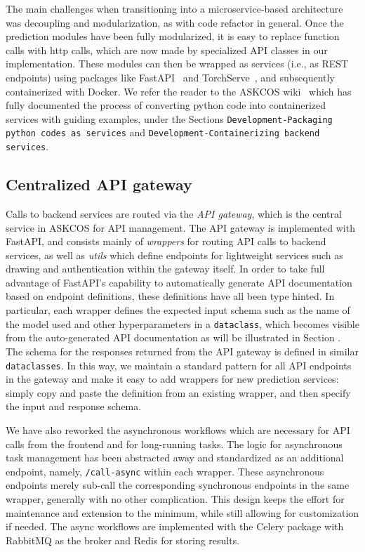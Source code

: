 \documentclass[pdflatex,sn-mathphys-num]{sn-jnl}%
\theoremstyle{thmstyleone}%
\theoremstyle{thmstyletwo}%
\theoremstyle{thmstylethree}%
\begin{document}
The main challenges when transitioning into a microservice-based architecture was decoupling and modularization, as with code refactor in general. Once the prediction modules have been fully modularized, it is easy to replace function calls with http calls, which are now made by specialized API classes in our implementation. These modules can then be wrapped as services (i.e., as REST endpoints) using packages like FastAPI~\citep{FastAPI} and TorchServe~\citep{TorchServe}, and subsequently containerized with Docker. We refer the reader to the ASKCOS wiki~\citep{ASKCOSwiki} which has fully documented the process of converting python code into containerized services with guiding examples, under the Sections \texttt{Development-Packaging python codes as services} and \texttt{Development-Containerizing backend services}.

\subsection{Centralized API gateway}\label{method_api_gateway}

Calls to backend services are routed via the \emph{API gateway}, which is the central service in ASKCOS for API management. The API gateway is implemented with FastAPI, and consists mainly of \emph{wrappers} for routing API calls to backend services, as well as \emph{utils} which define endpoints for lightweight services such as drawing and authentication within the gateway itself. In order to take full advantage of FastAPI's capability to automatically generate API documentation based on endpoint definitions, these definitions have all been type hinted. In particular, each wrapper defines the expected input schema such as the name of the model used and other hyperparameters in a \texttt{dataclass}, which becomes visible from the auto-generated API documentation as will be illustrated in Section . The schema for the responses returned from the API gateway is defined in similar \texttt{dataclasses}. In this way, we maintain a standard pattern for all API endpoints in the gateway and make it easy to add wrappers for new prediction services: simply copy and paste the definition from an existing wrapper, and then specify the input and response schema.

We have also reworked the asynchronous workflows which are necessary for API calls from the frontend and for long-running tasks. The logic for asynchronous task management has been abstracted away and standardized as an additional endpoint, namely, \texttt{/call-async} within each wrapper. These asynchronous endpoints merely sub-call the corresponding synchronous endpoints in the same wrapper, generally with no other complication. This design keeps the effort for maintenance and extension to the minimum, while still allowing for customization if needed. The async workflows are implemented with the Celery package with RabbitMQ as the broker and Redis for storing results.
\end{document}
